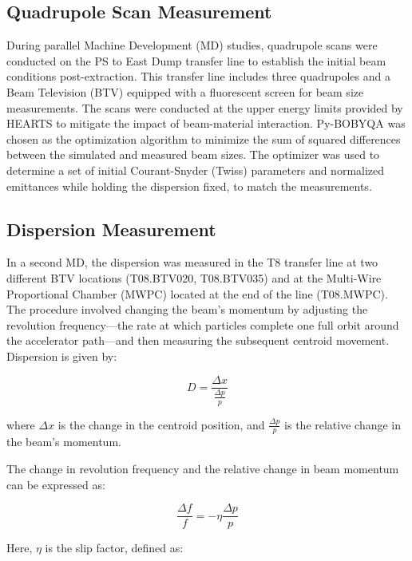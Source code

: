 \documentclass[a4paper,
               biblatex,     %
               ]{jacow}
\begin{document}
\subsection{Quadrupole Scan Measurement}

During parallel Machine Development (MD) studies, quadrupole scans were conducted on the PS to East Dump transfer line to establish the initial beam conditions post-extraction. This transfer line includes three quadrupoles and a Beam Television (BTV) equipped with a fluorescent screen for beam size measurements. The scans were conducted at the upper energy limits provided by HEARTS to mitigate the impact of beam-material interaction. Py-BOBYQA \cite{cartis_escaping_2022, cartis_improving_2019} was chosen as the optimization algorithm to minimize the sum of squared differences between the simulated and measured beam sizes. The optimizer was used to determine a set of initial Courant-Snyder (Twiss) parameters and normalized emittances while holding the dispersion fixed, to match the measurements.


\subsection{Dispersion Measurement}

In a second MD, the dispersion was measured in the T8 transfer line at two different BTV locations (T08.BTV020, T08.BTV035) and at the Multi-Wire Proportional Chamber (MWPC) located at the end of the line (T08.MWPC). The procedure involved changing the beam's momentum by adjusting the revolution frequency—the rate at which particles complete one full orbit around the accelerator path—and then measuring the subsequent centroid movement. Dispersion is given by:

\begin{equation}
D = \frac{\Delta x}{\frac{\Delta p}{p}}
\end{equation}

where $\Delta x$ is the change in the centroid position, and $\frac{\Delta p}{p}$ is the relative change in the beam's momentum.

The change in revolution frequency and the relative change in beam momentum can be expressed as:

\begin{equation}
\frac{\Delta f}{f} = -\eta \frac{\Delta p}{p}
\end{equation}

Here, $\eta$ is the slip factor, defined as:
\end{document}
